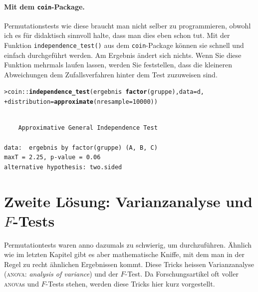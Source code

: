 \documentclass[oneside, 10pt]{book}\usepackage[]{graphicx}\usepackage[]{xcolor}
\makeatletter
\newcommand{\hlnum}[1]{\textcolor[rgb]{0.686,0.059,0.569}{#1}}%
\newcommand{\hlopt}[1]{\textcolor[rgb]{0,0,0}{#1}}%
\newcommand{\hlstd}[1]{\textcolor[rgb]{0.345,0.345,0.345}{#1}}%
\newcommand{\hlkwc}[1]{\textcolor[rgb]{0.333,0.667,0.333}{#1}}%
\newcommand{\hlkwd}[1]{\textcolor[rgb]{0.737,0.353,0.396}{\textbf{#1}}}%
\newenvironment{kframe}{%
 \def\at@end@of@kframe{}%
 \ifinner\ifhmode%
  \def\at@end@of@kframe{\end{minipage}}%
  \begin{minipage}{\columnwidth}%
 \fi\fi%
 \def\FrameCommand##1{\hskip\@totalleftmargin \hskip-\fboxsep
 \colorbox{shadecolor}{##1}\hskip-\fboxsep
     \hskip-\linewidth \hskip-\@totalleftmargin \hskip\columnwidth}%
 \MakeFramed {\advance\hsize-\width
   \@totalleftmargin\z@ \linewidth\hsize
   \@setminipage}}%
 {\par\unskip\endMakeFramed%
 \at@end@of@kframe}
\newenvironment{knitrout}{}{} %
\makeatother
\begin{document}
\paragraph{Mit dem \texttt{coin}-Package.}
Permutationstests wie diese braucht man nicht selber
zu programmieren, obwohl ich es für didaktisch sinnvoll halte,
dass man dies eben schon tut.
Mit der Funktion \texttt{independence\_test()}
aus dem \texttt{coin}-Package können sie schnell
und einfach durchgeführt werden. Am Ergebnis ändert sich nichts.
Wenn Sie
diese Funktion mehrmals laufen lassen, werden Sie feststellen,
dass die kleineren Abweichungen dem Zufallsverfahren hinter dem Test
zuzuweisen sind.
\begin{knitrout}
\color{fgcolor}\begin{kframe}
\begin{alltt}
\hlstd{> }\hlstd{coin}\hlopt{::}\hlkwd{independence_test}\hlstd{(ergebnis} \hlopt{~} \hlkwd{factor}\hlstd{(gruppe),} \hlkwc{data} \hlstd{= d,}
\hlstd{+ }                        \hlkwc{distribution} \hlstd{=} \hlkwd{approximate}\hlstd{(}\hlkwc{nresample} \hlstd{=} \hlnum{10000}\hlstd{))}
\end{alltt}
\begin{verbatim}

	Approximative General Independence Test

data:  ergebnis by factor(gruppe) (A, B, C)
maxT = 2.25, p-value = 0.06
alternative hypothesis: two.sided
\end{verbatim}
\end{kframe}
\end{knitrout}

\section{Zweite Lösung: Varianzanalyse und $F$-Tests}
Permutationtests waren anno dazumals zu schwierig,
um durchzuführen. Ähnlich wie im letzten Kapitel gibt es
aber mathematische Kniffe, mit dem man in der Regel zu recht
ähnlichen Ergebnissen kommt. Diese Tricks
heissen Varianzanalyse
(\textsc{anova}: \textit{analysis of variance})
und der $F$-Test. Da Forschungsartikel oft voller
\textsc{anova}s und $F$-Tests stehen, werden
diese Tricks hier kurz vorgestellt.
\end{document}
